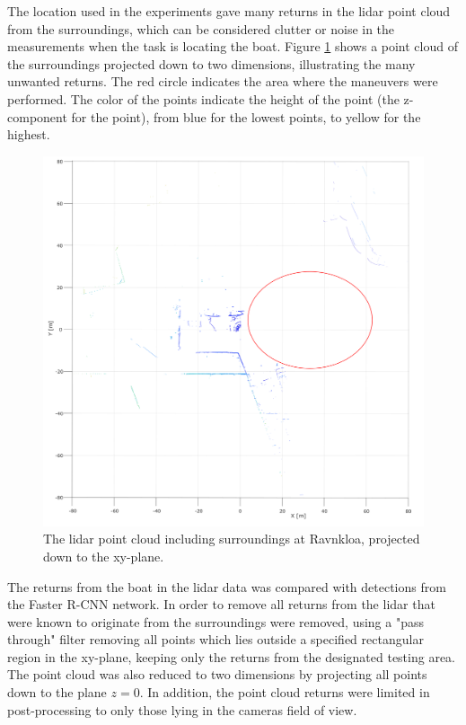 The location used in the experiments gave many returns in the lidar point cloud from the surroundings, which can be considered clutter or noise in the measurements when the task is locating the boat. Figure \ref{fig:ravnkloa_pointcloud} shows a point cloud of the surroundings projected down to two dimensions, illustrating the many unwanted returns. The red circle indicates the area where the maneuvers were performed. The color of the points indicate the height of the point (the z-component for the point), from blue for the lowest points, to yellow for the highest.
\begin{figure}[!htb]
	\centering
	\includegraphics[width=\linewidth]{fig/ravnkloa_surroundings.png}
	\caption{The lidar point cloud including surroundings at Ravnkloa, projected down to the xy-plane.}
	\label{fig:ravnkloa_pointcloud}
\end{figure}
The returns from the boat in the lidar data was compared with detections from the Faster R-CNN network. In order to remove all returns from the lidar that were known to originate from the surroundings were removed, using a "pass through" filter removing all points which lies outside a specified rectangular region in the xy-plane, keeping only the returns from the designated testing area. The point cloud was also reduced to two dimensions by projecting all points down to the plane $z=0$. In addition, the point cloud returns were limited in post-processing to only those lying in the cameras field of view.
